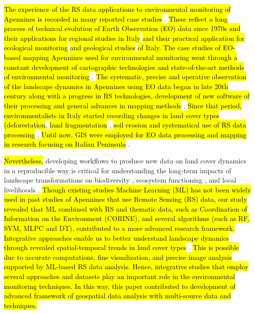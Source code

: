 \documentclass[jimaging,article,submit,pdftex,moreauthors]{Definitions/mdpi}
\begin{document}
\hl{The experience of the RS data applications to environmental monitoring of Apennines is recorded in many reported case studies} \cite{Leone01012001,Bonfiglio01012002,Salvati01062013,Haller17112018}. \hl{These reflect a long process of technical evolution of Earth Observation (EO) data since 1970s and their applications for regional studies in Italy} \cite{Lanorte01012019,Spinetti18082019,DaRonco02062020,} \hl{and their practical application for ecological monitoring} \cite{LEONE01041995,MariaBruschi01122012} \hl{and geological studies} \cite{Civile30112017,Panini09122020} \hl{of Italy. The case studies of EO-based mapping Apennines used for environmental monitoring went through a constant development of cartographic technologies and state-of-the-art methods of environmental monitoring} \cite{Petriccione01122005,Canullo01122005,Florenzano01012004,Segadelli30112017}. \hl{The systematic, precise and operative observation of the landscape dynamics in Apennines using EO data began in late 20th century along with a progress in RS technologies, development of new software of their processing and general advances in mapping methods} \cite{Savelli01032012,Mario31122023,Mariani13112018}. \hl{Since that period, environmentalists in Italy started recording changes in land cover types (deforestation}, \hl{land fragmentation} \cite{Salvati02012017,Franchini03092022,Meriggi01012001}, \hl{soil erosion and systematical use of RS data processing} \cite{DAmico31122022}. \hl{Until now, GIS were employed for EO data processing and mapping in research focusing on Italian Peninsula} \cite{Marsico30112017,Spinetti18082019}.

\hl{Nevertheless, }developing workflows to produce new data on land cover dynamics in a reproducible way is critical for understanding the long-term impacts of landscape transformations on biodiversity \cite{land14040828,rs17071296,rs17071304}, ecosystem functioning \cite{Jarnagin01092004}, and local livelihoods \cite{Kuemmerle_2016,Buthelezi16022024}. \hl{Though existing studies  Machine Learning (ML) has not been widely used in past studies of Apennines that use Remote Sensing (RS) data, our study revealed that ML combined with RS and thematic data, such as Coordination of Information on the Environment (CORINE), and several algorithms (such as RF, SVM, MLPC and DT), contributed to a more advanced research framework. Integrative approaches enable us to better understand landscape dynamics through revealed spatial-temporal trends in land cover types} \cite{DellOvo02092023}. \hl{This is possible due to accurate computations, fine visualization, and precise image analysis supported by ML-based RS data analysis. Hence, integrative studies that employ several approaches and datasets play an important role in the environmental monitoring techniques. In this way, this paper contributed to development of advanced framework of geospatial data analysis with multi-source data and techniques.}
\end{document}
